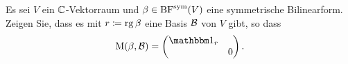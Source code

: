 \documentclass[a4paper, 10pt]{scrartcl}
\begin{document}


\begin{question}[subtitle = Symmetrische Bilinearformen über $\Complex$]
  \label{question: normal form for complex symmetric bilinear forms}
  Es sei $V$ ein $\Complex$-Vektorraum und $\beta \in \operatorname{BF}^{\operatorname{sym}}(V)$ eine symmetrische Bilinearform.
  Zeigen Sie, dass es mit $r \coloneqq \operatorname{rg} \beta$ eine Basis $\mathcal{B}$ von $V$ gibt, so dass
  \[
      \repmatrixbilsame{\beta}{\basis{B}}
    = \begin{pmatrix}
        \Id_r &   \\
              & 0
      \end{pmatrix}.
  \]
\end{question}
\end{document}
